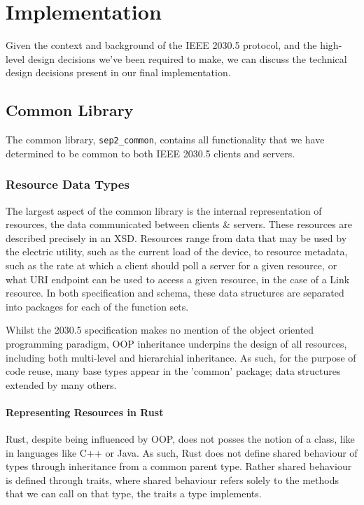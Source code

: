 \chapter{Implementation}\label{ch:implementation}
Given the context and background of the IEEE 2030.5 protocol, and the high-level design decisions we've been required to make, we can discuss the technical design decisions present in our final implementation.

\section{Common Library}
The common library, \texttt{sep2\_common}, contains all functionality that we have determined to be common to both IEEE 2030.5 clients and servers.

\subsection{Resource Data Types}
The largest aspect of the common library is the internal representation of resources, the data communicated between clients \& servers. These resources are described precisely in an XSD.
Resources range from data that may be used by the electric utility, such as the current load of the device, to resource metadata, such as the rate at which a client should poll a server for a given resource, or what URI endpoint can be used to access a given resource, in the case of a Link resource.
In both specification and schema, these data structures are separated into packages for each of the function sets.

Whilst the 2030.5 specification makes no mention of the object oriented programming paradigm, OOP inheritance underpins the design of all resources, including both multi-level and hierarchial inheritance.
As such, for the purpose of code reuse, many base types appear in the 'common' package; data structures extended by many others.

\subsubsection{Representing Resources in Rust}
Rust, despite being influenced by OOP, does not posses the notion of a class, like in languages like C++ or Java. As such, Rust does not define shared behaviour of types through inheritance from a common parent type. 
Rather shared behaviour is defined through traits, where shared behaviour refers solely to the methods that we can call on that type, the traits a type implements.

